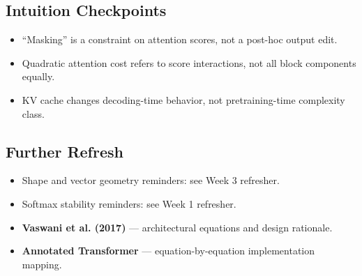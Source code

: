 \subsection*{Intuition Checkpoints}
\begin{itemize}[leftmargin=1.5em]
  \item ``Masking'' is a constraint on attention scores, not a post-hoc output edit.
  \item Quadratic attention cost refers to score interactions, not all block components equally.
  \item KV cache changes decoding-time behavior, not pretraining-time complexity class.
\end{itemize}

\subsection*{Further Refresh}
\begin{itemize}[leftmargin=1.5em]
  \item Shape and vector geometry reminders: see Week 3 refresher.
  \item Softmax stability reminders: see Week 1 refresher.
  \item \textbf{Vaswani et al. (2017)} --- architectural equations and design rationale.
  \item \textbf{Annotated Transformer} --- equation-by-equation implementation mapping.
\end{itemize}
